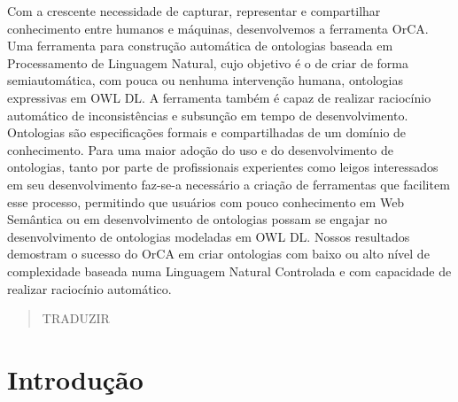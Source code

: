 \documentclass{bcc}
\begin{document}

\capa



\begin{resumo}

Com a crescente necessidade de capturar, representar e compartilhar conhecimento entre humanos e máquinas, desenvolvemos a ferramenta OrCA. Uma ferramenta para construção automática de ontologias baseada em Processamento de Linguagem Natural, cujo objetivo é o de criar de forma semiautomática, com pouca ou nenhuma intervenção humana, ontologias expressivas em OWL DL. A ferramenta também é capaz  de realizar raciocínio automático de inconsistências e subsunção em tempo de desenvolvimento. Ontologias são especificações formais e compartilhadas de um domínio de conhecimento. Para uma maior adoção do uso e do desenvolvimento de ontologias, tanto por parte de profissionais experientes como leigos interessados em seu desenvolvimento faz-se-a necessário a criação de ferramentas que facilitem esse processo, permitindo que usuários com pouco conhecimento em Web Semântica ou em desenvolvimento de ontologias possam se engajar no desenvolvimento de ontologias modeladas em OWL DL. Nossos resultados demostram o sucesso do OrCA em criar ontologias com baixo ou alto nível de complexidade baseada numa Linguagem Natural Controlada e com capacidade de realizar raciocínio automático.

\end{resumo}


\begin{abstract}
TRADUZIR    
\end{abstract}



\renewcommand\contentsname{\centerline{Sumário}}
\renewcommand\listfigurename{\centerline{Lista de Figuras}}
\renewcommand\listtablename{\centerline{Lista de Tabelas}}

\tableofcontents

\listoffigures
{}

\listoftables
{}

\inicio
\chapter{Introdução}
\end{document}

